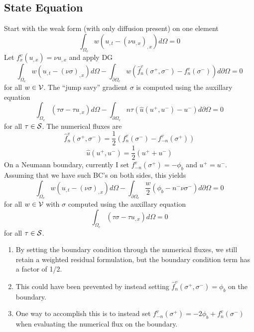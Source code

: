 \documentclass[12pt]{article}
\begin{document}
\subsection{State Equation}
Start with the weak form (with only diffusion present) on one element
\begin{equation}
\int_{\Omega_e} w \left( u_{,t} - (\nu u_{,x})_{,x} \right) d\Omega = 0
\end{equation}
Let $f_x^v(u_{,x}) = \nu u_{,x}$ and apply DG
\begin{equation}
\int_{\Omega_e} w \left( u_{,t} - (\nu\sigma)_{,x} \right) d\Omega -
\int_{\partial\Omega_e} w \left( \hat f^v_n(\sigma^+,\sigma^-) - 
                            f^v_n(\sigma^-) \right) d\partial\Omega = 0
\end{equation}
for all $w \in {\cal V}$.  The ``jump savy'' gradient $\sigma$ is computed
using the auxillary equation
\begin{equation}
 \int_{\Omega_e} \left( \tau\sigma - \tau u_{,x} \right) d\Omega -
 \int_{\partial\Omega_e} n \tau\left( \hat u(u^+,u^-) - u^- \right) 
 d\partial\Omega = 0
\end{equation}
for all $\tau \in {\cal S}$.  The numerical fluxes are
\begin{equation}
  \hat f^v_n(\sigma^+,\sigma^-) = \frac{1}{2}\left( f^v_n(\sigma^-) - 
                                                    f^v_{-n}(\sigma^+) \right)
\end{equation}
\begin{equation}
  \hat u(u^+,u^-) = \frac{1}{2}\left( u^+ + u^- \right)
\end{equation}
On a Neumann boundary, currently I set $f^v_{-n}(\sigma^+)=-\phi_b$ and $u^+ =
u^-$.  Assuming that we have such BC's on both sides, this yields
\begin{equation}
\int_{\Omega_e} w \left( u_{,t} - (\nu\sigma)_{,x} \right) d\Omega -
\int_{\partial\Omega_e} \frac{w}{2}\left( \phi_b - n^-\nu\sigma^- \right) 
d\partial\Omega = 0
\end{equation}
for all $w \in {\cal V}$ with $\sigma$ computed using the auxillary equation
\begin{equation}
 \int_{\Omega_e} \left( \tau\sigma - \tau u_{,x} \right) d\Omega = 0
\end{equation}
for all $\tau \in {\cal S}$.

\medskip
{}
\begin{enumerate}
\item By setting the boundary condition through the numerical fluxes, we still
  retain a weighted residual formulation, but the boundary condition term has
  a factor of 1/2.
\item This could have been prevented by instead setting $\hat
  f^v_{n}(\sigma^+,\sigma^-) = \phi_b$ on the boundary.
\item One way to accomplish this is to instead set $f^v_{-n}(\sigma^+) =
  -2\phi_b + f^v_{n}(\sigma^-)$ when evaluating the numerical flux on the
  boundary.
\end{enumerate}
\end{document}
